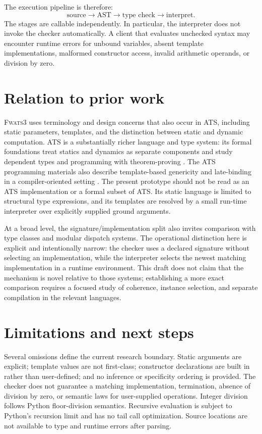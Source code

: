 \documentclass[11pt]{article}
\newcommand{\FWATS}{\textsc{Fwats3}}
\begin{document}
The execution pipeline is therefore:
\[
  \text{source}\longrightarrow\text{AST}
  \longrightarrow\text{type check}
  \longrightarrow\text{interpret}.
\]
The stages are callable independently. In particular, the interpreter does
not invoke the checker automatically. A client that evaluates unchecked
syntax may encounter runtime errors for unbound variables, absent template
implementations, malformed constructor access, invalid arithmetic operands,
or division by zero.

\section{Relation to prior work}

\FWATS{} uses terminology and design concerns that also occur in ATS,
including static parameters, templates, and the distinction between static
and dynamic computation. ATS is a substantially richer language and type
system: its formal foundations treat statics and dynamics as separate
components and study dependent types and programming with theorem-proving
\cite{xi-ats-foundation}. The ATS programming materials also describe
template-based genericity and late-binding in a compiler-oriented setting
\cite{ats-template-doc}. The present prototype should not be read as an ATS
implementation or a formal subset of ATS. Its static language is limited to
structural type expressions, and its templates are resolved by a small
run-time interpreter over explicitly supplied ground arguments.

At a broad level, the signature/implementation split also invites comparison
with type classes and modular dispatch systems. The operational distinction
here is explicit and intentionally narrow: the checker uses a declared
signature without selecting an implementation, while the interpreter
selects the newest matching implementation in a runtime environment. This
draft does not claim that the mechanism is novel relative to those systems;
establishing a more exact comparison requires a focused study of coherence,
instance selection, and separate compilation in the relevant languages.

\section{Limitations and next steps}

Several omissions define the current research boundary. Static arguments are
explicit; template values are not first-class; constructor declarations are
built in rather than user-defined; and no inference or specificity ordering
is provided. The checker does not guarantee a matching implementation,
termination, absence of division by zero, or semantic laws for user-supplied
operations. Integer division follows Python floor-division semantics.
Recursive evaluation is subject to Python's recursion limit and has no tail
call optimization. Source locations are not available to type and runtime
errors after parsing.
\end{document}
